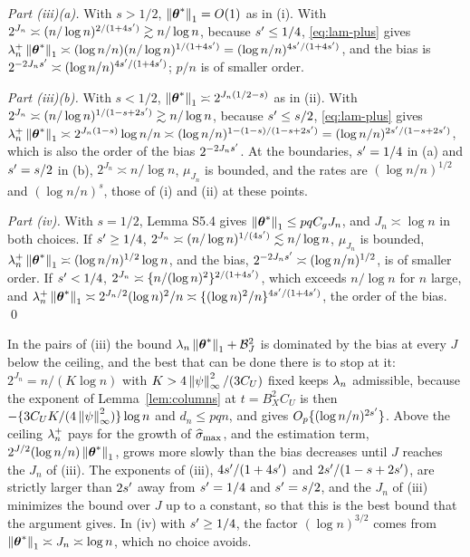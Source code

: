 \emph{Part (iii)(a).} With $s > 1/2$, $\left\lVert \boldsymbol{\theta}^{*} \right\rVert_{1} = O(1)$ as in
(i). With $2^{J_n} \asymp (n/\log n)^{2/(1+4s')} \gtrsim n/\log n$,
because $s' \le 1/4$, \eqref{eq:lam-plus} gives
$\lambda_{n}^{+}\left\lVert \boldsymbol{\theta}^{*} \right\rVert_{1} \asymp (\log n/n)(n/\log n)^{1/(1+4s')} =
(\log n/n)^{4s'/(1+4s')}$, and the bias is
$2^{-2J_ns'} \asymp (\log n/n)^{4s'/(1+4s')}$; $p/n$ is of smaller
order.

\emph{Part (iii)(b).} With $s < 1/2$, $\left\lVert \boldsymbol{\theta}^{*} \right\rVert_{1} \asymp
2^{J_n(1/2-s)}$ as in (ii). With
$2^{J_n} \asymp (n/\log n)^{1/(1-s+2s')} \gtrsim n/\log n$, because
$s' \le s/2$, \eqref{eq:lam-plus} gives
$\lambda_{n}^{+}\left\lVert \boldsymbol{\theta}^{*} \right\rVert_{1} \asymp 2^{J_n(1-s)}\log n/n \asymp
(\log n/n)^{1-(1-s)/(1-s+2s')} = (\log n/n)^{2s'/(1-s+2s')}$, which
is also the order of the bias $2^{-2J_ns'}$. At the boundaries,
$s' = 1/4$ in (a) and $s' = s/2$ in (b), $2^{J_n} \asymp n/\log n$,
$\mu_{J_n}$ is bounded, and the rates are $(\log n/n)^{1/2}$ and
$(\log n/n)^{s}$, those of (i) and (ii) at these points.

\emph{Part (iv).} With $s = 1/2$, Lemma S5.4 gives
$\left\lVert \boldsymbol{\theta}^{*} \right\rVert_{1} \le pqC_gJ_n$, and $J_n \asymp \log n$ in both
choices. If $s' \ge 1/4$,
$2^{J_n} \asymp (n/\log n)^{1/(4s')} \lesssim n/\log n$, $\mu_{J_n}$ is
bounded, $\lambda_{n}^{+}\left\lVert \boldsymbol{\theta}^{*} \right\rVert_{1} \asymp (\log n/n)^{1/2}\log n$,
and the bias, $2^{-2J_ns'} \asymp (\log n/n)^{1/2}$, is of smaller order.
If $s' < 1/4$, $2^{J_n} \asymp \{n/(\log n)^{2}\}^{2/(1+4s')}$, which
exceeds $n/\log n$ for $n$ large, and $\lambda_{n}^{+}\left\lVert \boldsymbol{\theta}^{*} \right\rVert_{1} \asymp
2^{J_n/2}(\log n)^{2}/n \asymp \{(\log n)^{2}/n\}^{4s'/(1+4s')}$, the
order of the bias. \qed

\begin{remark}
\label{rem:ceiling}
In the pairs of (iii) the bound $\lambda_{n}\left\lVert \boldsymbol{\theta}^{*} \right\rVert_{1} +
\mathcal{B}_{J}^{2}$ is dominated by the bias at every $J$ below the ceiling,
and the best that can be done there is to stop at it: $2^{J_n} = n/(K\log n)$
with $K > 4\left\lVert \psi \right\rVert_{\infty}^{2}/(3C_U)$ fixed keeps $\lambda_{n}$ admissible,
because the exponent of Lemma~\ref{lem:columns} at $t = B_X^{2}C_U$ is then
$-\{3C_UK/(4\left\lVert \psi \right\rVert_{\infty}^{2})\}\log n$ and $d_n \le pqn$, and gives
$O_p\{(\log n/n)^{2s'}\}$. Above the ceiling $\lambda_{n}^{+}$ pays for the
growth of $\widehat{\sigma}_{\max}$, and the estimation term,
$2^{J/2}(\log n/n)\left\lVert \boldsymbol{\theta}^{*} \right\rVert_{1}$, grows more slowly than the bias
decreases until $J$ reaches the $J_n$ of (iii). The exponents of (iii),
$4s'/(1+4s')$ and $2s'/(1-s+2s')$, are strictly larger than
$2s'$ away from $s' = 1/4$ and $s' = s/2$, and the $J_n$ of (iii)
minimizes the bound over $J$ up to a constant, so that this is the best bound
that the argument gives. In (iv) with $s' \ge 1/4$, the factor
$(\log n)^{3/2}$ comes from $\left\lVert \boldsymbol{\theta}^{*} \right\rVert_{1} \asymp J_n \asymp \log n$,
which no choice avoids.
\end{remark}

